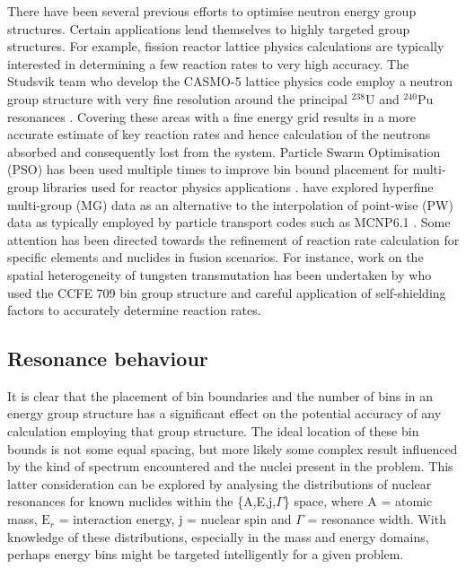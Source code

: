 There have been several previous efforts to optimise neutron energy group structures. Certain applications lend themselves to highly targeted group structures. For example, fission reactor lattice physics calculations are typically interested in determining a few reaction rates to very high accuracy. The Studsvik team who develop the CASMO-5 lattice physics code employ a neutron group structure with very fine resolution around the principal $^{238}\mathrm{U}$ and $^{240}\mathrm{Pu}$ resonances \cite{Rhodes2006}. Covering these areas with a fine energy grid results in a more accurate estimate of key reaction rates and hence calculation of the neutrons absorbed and consequently lost from the system. Particle Swarm Optimisation (PSO) has been used multiple times to improve bin bound placement for multi-group libraries used for reactor physics applications \cite{Yi2013} \cite{Akbari2012} \cite{Akbari2013} \cite{Fleming2016}. \citet{Morgan2013} have explored hyperfine multi-group (MG) data as an alternative to the interpolation of point-wise (PW) data as typically employed by particle transport codes such as MCNP6.1 \cite{goorley2012}. Some attention has been directed towards the refinement of reaction rate calculation for specific elements and nuclides in fusion scenarios. For instance, work on the spatial heterogeneity of tungsten transmutation has been undertaken by \citet{Gilbert2016} who used the CCFE 709 bin group structure and careful application of self-shielding factors to accurately determine reaction rates.

\subsection{Resonance behaviour}
It is clear that the placement of bin boundaries and the number of bins in an energy group structure has a significant effect on the potential accuracy of any calculation employing that group structure. The ideal location of these bin bounds is not some equal spacing, but more likely some complex result influenced by the kind of spectrum encountered and the nuclei present in the problem. This latter consideration can be explored by analysing the distributions of nuclear resonances for known nuclides within the \{A,E,j,$\Gamma$\} space, where A = atomic mass, $\mathrm{E}_{r}$ = interaction energy, j = nuclear spin and $\Gamma$ = resonance width. With knowledge of these distributions, especially in the mass and energy domains, perhaps energy bins might be targeted intelligently for a given problem.

